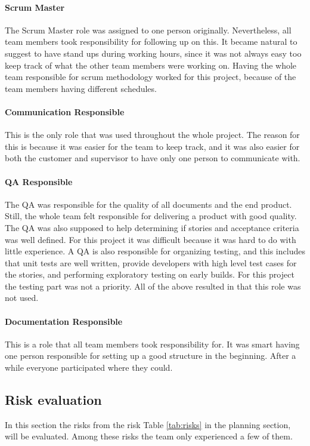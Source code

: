 \paragraph{Scrum Master}
The Scrum Master role was assigned to one person originally. Nevertheless, all team members took responsibility for following up on this. It became natural to suggest to have stand ups during working hours, since it was not always easy too keep track of what the other team members were working on. Having the whole team responsible for scrum methodology worked for this project, because of the team members having different schedules. 

\paragraph{Communication Responsible}
This is the only role that was used throughout the whole project. The reason for this is because it was easier for the team to keep track, and it was also easier for both the customer and supervisor to have only one person to communicate with.    

\paragraph{QA Responsible}
The QA was responsible for the quality of all documents and the end product. Still, the whole team felt responsible for delivering a product with good quality. The QA was also supposed to help determining if stories and acceptance criteria was well defined. For this project it was difficult because it was hard to do with little experience. A QA is also responsible for organizing testing, and this includes that unit tests are well written, provide developers with high level test cases for the stories, and performing exploratory testing on early builds. For this project the testing part was not a priority. All of the above resulted in that this role was not used.

\paragraph{Documentation Responsible}
This is a role that all team members took responsibility for. It was smart having one person responsible for setting up a good structure in the beginning. After a while everyone participated where they could. 

\subsection{Risk evaluation}
In this section the risks from the risk Table \ref{tab:risks} in the planning section, will be evaluated. Among these risks the team only experienced a few of them.

